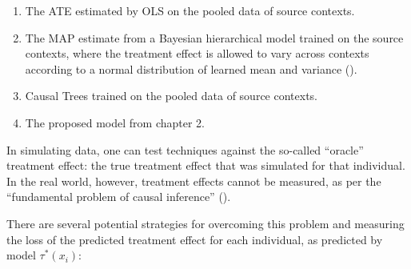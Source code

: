 \documentclass[a4paper,12pt]{article}
\begin{document}
\begin{enumerate}
\item The ATE estimated by OLS on the pooled data of source contexts.
\item The MAP estimate from a Bayesian hierarchical model trained on the source contexts, where the treatment effect is allowed to vary across contexts according to a normal distribution of learned mean and variance (\cite{}).
\item Causal Trees trained on the pooled data of source contexts.
\item The proposed model from chapter 2.
\end{enumerate}

In simulating data, one can test techniques against the so-called ``oracle'' treatment effect: the true treatment effect that was simulated for that individual. In the real world, however, treatment effects cannot be measured, as per the ``fundamental problem of causal inference'' (\cite{}).

There are several potential strategies for overcoming this problem and measuring the loss of the predicted treatment effect for each individual, as predicted by model $\tau^*(x_i)$:
\end{document}

